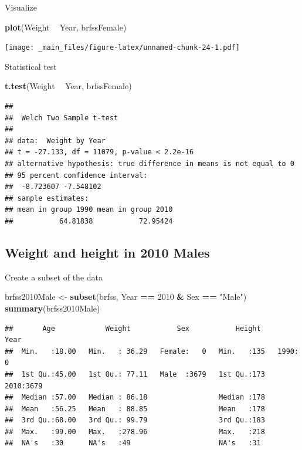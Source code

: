 \documentclass[]{article}
\newenvironment{Shaded}{\begin{snugshade}}{\end{snugshade}}
\newcommand{\KeywordTok}[1]{\textcolor[rgb]{0.13,0.29,0.53}{\textbf{#1}}}
\newcommand{\DecValTok}[1]{\textcolor[rgb]{0.00,0.00,0.81}{#1}}
\newcommand{\StringTok}[1]{\textcolor[rgb]{0.31,0.60,0.02}{#1}}
\newcommand{\OperatorTok}[1]{\textcolor[rgb]{0.81,0.36,0.00}{\textbf{#1}}}
\newcommand{\NormalTok}[1]{#1}
\theoremstyle{definition}
\theoremstyle{definition}
\theoremstyle{remark}
\begin{document}
Visualize

\begin{Shaded}
\begin{Highlighting}[]
\KeywordTok{plot}\NormalTok{(Weight }\OperatorTok{~}\StringTok{ }\NormalTok{Year, brfssFemale)}
\end{Highlighting}
\end{Shaded}

\texttt{[image: \_main\_files/figure-latex/unnamed-chunk-24-1.pdf]}

Statistical test

\begin{Shaded}
\begin{Highlighting}[]
\KeywordTok{t.test}\NormalTok{(Weight }\OperatorTok{~}\StringTok{ }\NormalTok{Year, brfssFemale)}
\end{Highlighting}
\end{Shaded}

\begin{verbatim}
## 
##  Welch Two Sample t-test
## 
## data:  Weight by Year
## t = -27.133, df = 11079, p-value < 2.2e-16
## alternative hypothesis: true difference in means is not equal to 0
## 95 percent confidence interval:
##  -8.723607 -7.548102
## sample estimates:
## mean in group 1990 mean in group 2010 
##           64.81838           72.95424
\end{verbatim}

\subsection{Weight and height in 2010
Males}\label{weight-and-height-in-2010-males}

Create a subset of the data

\begin{Shaded}
\begin{Highlighting}[]
\NormalTok{brfss2010Male <-}\StringTok{ }\KeywordTok{subset}\NormalTok{(brfss,  Year }\OperatorTok{==}\StringTok{ }\DecValTok{2010} \OperatorTok{&}\StringTok{ }\NormalTok{Sex }\OperatorTok{==}\StringTok{ "Male"}\NormalTok{)}
\KeywordTok{summary}\NormalTok{(brfss2010Male)}
\end{Highlighting}
\end{Shaded}

\begin{verbatim}
##       Age            Weight           Sex           Height      Year     
##  Min.   :18.00   Min.   : 36.29   Female:   0   Min.   :135   1990:   0  
##  1st Qu.:45.00   1st Qu.: 77.11   Male  :3679   1st Qu.:173   2010:3679  
##  Median :57.00   Median : 86.18                 Median :178              
##  Mean   :56.25   Mean   : 88.85                 Mean   :178              
##  3rd Qu.:68.00   3rd Qu.: 99.79                 3rd Qu.:183              
##  Max.   :99.00   Max.   :278.96                 Max.   :218              
##  NA's   :30      NA's   :49                     NA's   :31
\end{verbatim}
\end{document}
